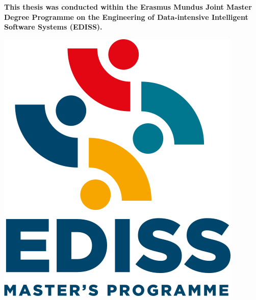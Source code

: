 \documentclass[
11pt, %
english, %
singlespacing, %
headsepline, %
]{MastersDoctoralThesis} %
\begin{document}

\begin{center}
	\vspace*{0.2\textheight}
	
	{\textbf{This thesis was conducted within the Erasmus Mundus Joint Master Degree Programme on the Engineering of Data-intensive Intelligent Software Systems (EDISS).}}

	\vspace{2cm}

	\includegraphics[width=0.4\linewidth]{Figures/logos/EDISS_Transparent.png}

	\vspace{2cm}
\end{center}


\end{document}
